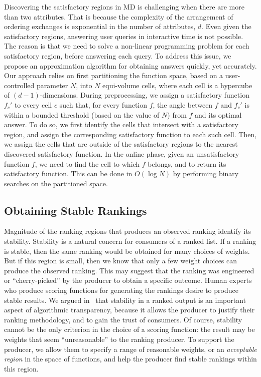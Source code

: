 Discovering the satisfactory regions in MD is challenging when there are more than two attributes.
That is because the complexity of the arrangement of ordering exchanges is exponential in the number of attributes, $d$.
Even given the satisfactory regions, answering user queries in interactive time is not possible. The reason is that we need to solve a non-linear programming problem for each satisfactory region, before answering each query.
To address this issue, we propose an approximation algorithm for obtaining answers quickly, yet accurately.
Our approach relies on first partitioning the function space, based on a user-controlled parameter $N$, into $N$ equi-volume cells, where each cell is a hypercube of $(d-1)$-dimensions.
During preprocessing, we assign a satisfactory function $f_c'$ to every cell $c$ such that, for every function $f$, 
the angle between $f$ and $f_c'$ is within a bounded threshold (based on the value of $N$) from $f$ and its optimal answer.
To do so, we first identify the cells that intersect with a satisfactory region, and assign the corresponding satisfactory function to each such cell. Then, we assign the cells that are outside of the satisfactory regions to the nearest discovered satisfactory function.
In the online phase, given an unsatisfactory function $f$, we need to find the cell to which $f$ belongs, and to return its satisfactory function. 
This can be done in $O(\log N)$ by performing binary searches on the partitioned space.



\subsection{Obtaining Stable Rankings}\label{sec:stability} %
Magnitude of the ranking regions that produces an observed ranking identify its stability.
Stability is a natural concern for consumers of a ranked list.  If a ranking is stable, then the same ranking would be obtained for many choices of weights.  But if this region is small, then we know that only a few weight choices can produce the observed ranking.  This may suggest that the ranking was engineered or ``cherry-picked'' by the producer to obtain a specific outcome. 
Human experts who produce scoring functions for generating the rankings desire to produce stable results.  We argued in~\cite{yang2018nutritional} that stability in a ranked output is an important aspect of algorithmic transparency, because it allows the producer to justify their ranking methodology, and to gain the trust of consumers.
Of course, stability cannot be the only criterion in the choice of a scoring function: the result may be weights that seem ``unreasonable'' to the ranking producer.  To support the producer, we allow them to specify a range of reasonable weights, or an {\em acceptable region} in the space of functions, and help the producer find stable rankings within this region. 

